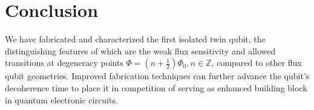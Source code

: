 \section{Conclusion}
\noindent We  have fabricated  and characterized  the first
isolated twin  qubit, the distinguishing features  of which
are  the weak  flux sensitivity  and allowed  \ilra
{}      transitions     at      degeneracy     points
$ \Phi = (n+\frac{1}{2})\Phi_0, n\in\mathbb{Z} $, compared to other
flux qubit geometries.  Improved fabrication techniques can
further advance the qubit's decoherence time to place it in
competition  of  serving  as  enhanced  building  block  in
quantum electronic circuits.


\noindent
